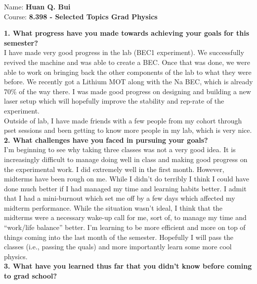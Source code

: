 \documentclass{article}
\theoremstyle{definition}
\begin{document}
		\begin{framed}
			\noindent Name: \textbf{Huan Q. Bui}\\
			Course: \textbf{8.398 - Selected Topics Grad Physics}
		\end{framed}
	
	
\noindent \textbf{1. What progress have you made towards achieving your goals for this semester?}\\

I have made very good progress in the lab (BEC1 experiment). We successfully revived the machine and was able to create a BEC. Once that was done, we were able to work on bringing back the other components of the lab to what they were before. We recently got a Lithium MOT along with the Na BEC, which is already 70\% of the way there. I was made good progress on designing and building a new laser setup which will hopefully improve the stability and rep-rate of the experiment. \\

Outside of lab, I have made friends with a few people from my cohort through pset sessions and been getting to know more people in my lab, which is very nice. \\



\noindent \textbf{2. What challenges have you faced in pursuing your goals?}\\


I'm beginning to see why taking three classes was not a very good idea. It is increasingly difficult to manage doing well in class and making good progress on the experimental work. I did extremely well in the first month. However, midterms have been rough on me. While I didn't do terribly I think I could have done much better if I had managed my time and learning habits better. I admit that I had a mini-burnout which set me off by a few days which affected my midterm performance. While the situation wasn't ideal, I think that the midterms were a necessary wake-up call for me, sort of, to manage my time and ``work/life balance'' better. I'm learning to be more efficient and more on top of things coming into the last month of the semester. Hopefully I will pass the classes (i.e., passing the quals) and more importantly learn some more cool physics. \\



\noindent \textbf{3. What have you learned thus far that you didn't know before coming to grad school?}\\
	
\end{document}
